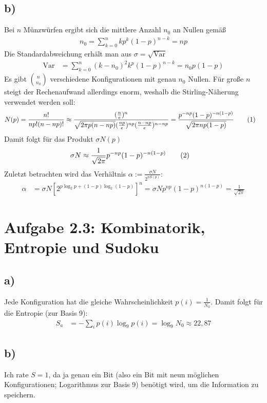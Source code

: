 \documentclass[a4paper,12pt]{article}
\newcommand\numberthis{\addtocounter{equation}{1}\tag{\theequation}}
\newcommand{\klam}{}
\newcommand{\tecxt}{}
\begin{document}
\subsection*{b)}
Bei $n$ Münzwürfen ergibt sich die mittlere Anzahl $n_0$ an Nullen gemäß
\begin{align*}
n_0=\sum_{k=0}^nkp^k(1-p)^{n-k}=np
\end{align*} 
Die Standardabweichung erhält man aus $\sigma=\sqrt{\tecxt\text{Var}}$
\begin{align*}
\tecxt\text{Var}&=\sum_{k=0}^n(k-n_0)^2k^p(1-p)^{n-k}=n_0p(1-p)
\end{align*}
Es gibt $\binom{n}{n_0}$ verschiedene Konfigurationen mit genau $n_0$ Nullen. Für große $n$ steigt der Rechenaufwand allerdings enorm, weshalb die Stirling-Näherung verwendet werden soll:
\begin{align*}
N(p)&=\frac{n!}{np!(n-np)!}\approx\frac{(\frac{n}{e})^n}{\sqrt{2\pi p(n-np)}(\frac{np}{e})^{np}(\frac{n-np}{e})^{n-np}}=\frac{p^{-np}(1-p)^{-n(1-p)}}{\sqrt{2\pi np(1-p)}}\numberthis\label{equation:N von p}
\end{align*}
Damit folgt für das Produkt $\sigma N(p)$
\begin{align*}
\sigma N&\approx \frac{1}{\sqrt{2\pi}}p^{-np}(1-p)^{-n(1-p)}\numberthis\label{equation: sigma N von p}
\end{align*}
Zuletzt betrachten wird das Verhältnis $\alpha:=\frac{\sigma N}{2^{nS(p)}}$:
\begin{align*}
\alpha &=\sigma N \klam\left[ {2^{p\log_2p+(1-p)\log_2(1-p)}} \right]^n=\sigma Np^{np}(1-p)^{n(1-p)}=\frac{1}{\sqrt{2\pi}}
\end{align*}
\section*{Aufgabe 2.3: Kombinatorik, Entropie und Sudoku}
\subsection*{a)}Jede Konfiguration hat die gleiche Wahrscheinlichkeit $p(i)=\frac{1}{N_0}$. Damit folgt für die Entropie (zur Basis 9):
\begin{align*}
S_a&=-\sum_ip(i)\log_9p(i)=\log_9N_0\approx 22,87
\end{align*}
\subsection*{b)}Ich rate $S=1$, da ja genau ein Bit (also ein Bit mit neun möglichen Konfigurationen; Logarithmus zur Basis 9) benötigt wird, um die Information zu speichern.
\end{document}

